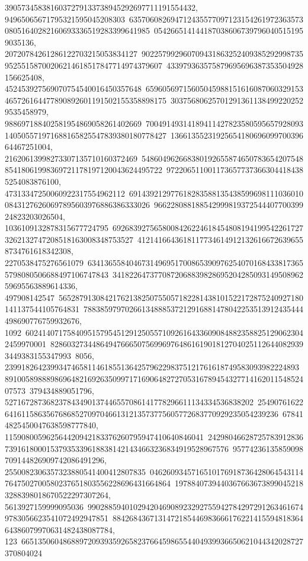 {{{3905734583816037279133738945292697711191554432, 94965065671795321595045208303\
63570608269471243557709712315426197236357308051640282160693336519283399641985\
0542665141441870386067397960405151959035136, 20720784261286122703215053834127\
90225799296070943186325240938529299873595255158700206214618517847714974379607\
433979363575879695696387353504928156625408, 452453927569070754540016450357648\
65960569715605045988151616087060329153465726164477890892601191502155358898175\
303756806257012913611384992202529535458979, 988697188402581954869058261402669\
70049149314189411427823580595657928093140505571971688165825547839380180778427\
1366135523192565418069609970039664467251004, 21620613998273307135710160372469\
54860496266838019265587465078365420754885418061998369721178197120043624495722\
9722065110011736577373663044184385254083876100, 47313347250060922317554962112\
69143921297761828358813543859969811103601008431276260697895603976886386333026\
96622808818854299981937254440770039924823203026504, 1036109132878315677724795\
69268392756580084262246184548081941995422617273262132747208518163008348753527\
41214166436181177346149121326166726396558734761618342308, 2270538475276561079\
63413655840467314969517008653909762540701684338173655798080506688497106747843\
341822647377087206883982869520428509314950896259695563889614336, 497908142547\
56528791308421762138250755057182281438101522172875240927180141137544105764831\
78838597970266134888537212916881478042253513912435444498690776759932676, 1092\
60241407175840951579545129125055710926164336090848823588251290623042459970001\
82860327344864947666507569969764861619018127040251126440829393449383155347993\
8056, 23991826423993474658114618551364257962298375121761618749583093982224893\
89100589888986964821692635099717169064827270531678945432771416201154852407573\
379434889051796, 527167287368237843490137446557086141778296611134334536838202\
25490761622641611586356768685270970466131213573775605772683770929235054239236\
678414825450047638598777840, 115908005962564420942183376260795947410640846041\
24298046628725783912836739161800015379353396188381421434663236834919528967576\
95774236135859098709144826909742086491296, 2550082306357323880541400412807835\
04626093457165101769187364280645431147647502700580237651803556228696431664864\
19788407394403676636738990452183288398018670522297307264, 5613927159999095036\
99028859401029420469089232927559427842972912634616749783056623541072492947851\
884268436713147218544698366617622141559481836464386079970631482438087784, 123\
66513506048688972093935926582376645986554404939936650621044342028727370804024\
}}}
